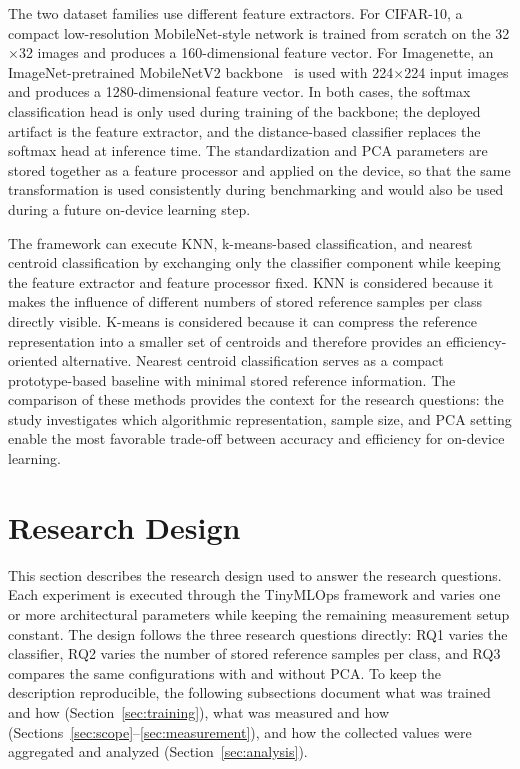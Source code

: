 \documentclass[sigconf,review]{acmart}
\begin{document}
The two dataset families use different feature extractors.
For CIFAR-10, a compact low-resolution MobileNet-style network is trained from scratch on the 32$\times$32 images and produces a 160-dimensional feature vector.
For Imagenette, an ImageNet-pretrained MobileNetV2 backbone~\cite{sandler2018mobilenetv2} is used with 224$\times$224 input images and produces a 1280-dimensional feature vector.
In both cases, the softmax classification head is only used during training of the backbone; the deployed artifact is the feature extractor, and the distance-based classifier replaces the softmax head at inference time.
The standardization and PCA parameters are stored together as a feature processor and applied on the device, so that the same transformation is used consistently during benchmarking and would also be used during a future on-device learning step.

The framework can execute KNN, k-means-based classification, and nearest centroid classification by exchanging only the classifier component while keeping the feature extractor and feature processor fixed.
KNN is considered because it makes the influence of different numbers of stored reference samples per class directly visible.
K-means is considered because it can compress the reference representation into a smaller set of centroids and therefore provides an efficiency-oriented alternative.
Nearest centroid classification serves as a compact prototype-based baseline with minimal stored reference information.
The comparison of these methods provides the context for the research questions: the study investigates which algorithmic representation, sample size, and PCA setting enable the most favorable trade-off between accuracy and efficiency for on-device learning.

\section{Research Design}
\label{sec:design}
This section describes the research design used to answer the research questions.
Each experiment is executed through the TinyMLOps framework and varies one or more architectural parameters while keeping the remaining measurement setup constant.
The design follows the three research questions directly: RQ1 varies the classifier, RQ2 varies the number of stored reference samples per class, and RQ3 compares the same configurations with and without PCA.
To keep the description reproducible, the following subsections document what was trained and how (Section~\ref{sec:training}), what was measured and how (Sections~\ref{sec:scope}--\ref{sec:measurement}), and how the collected values were aggregated and analyzed (Section~\ref{sec:analysis}).
\end{document}
